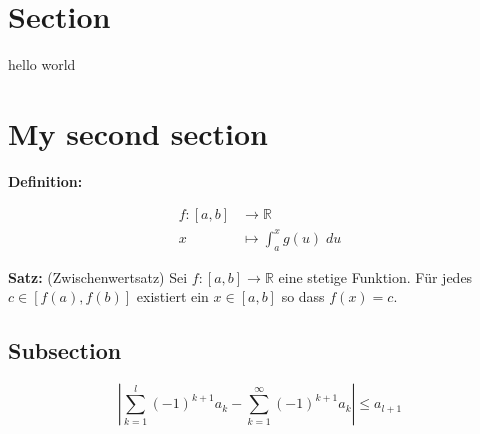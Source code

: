 \documentclass[11pt, a4paper]{article}
\begin{document}
	
	\setformat
	
	\section*{Section}
	\begin{fullbox}
		hello world
	\end{fullbox}
	\section*{My second section}
	\textbf{Definition:} \lipsum[13]
	
	\begin{fullbox}
	 	\begin{align*}
	 		f:[a,b] &\rightarrow \mathbb{R}\\
	 		x &\mapsto \int_a^x g(u)\; du
	 	\end{align*}
	\end{fullbox}
	
	\begin{outline}
		\textbf{Satz:} (Zwischenwertsatz) Sei $f:[a,b]\rightarrow \mathbb R$ eine stetige Funktion. Für jedes $c \in [f(a),f(b)]$ existiert ein $x \in [a,b]$ so dass $f(x) = c$.  
	 
	\end{outline}
	 	
	\subsection*{Subsection}
	
	\[\left| \sum_{k=1}^l (-1)^{k+1} a_k -\sum_{k=1}^\infty (-1)^{k+1} a_k\right| \leq a_{l+1}\]\
	
\end{document}
